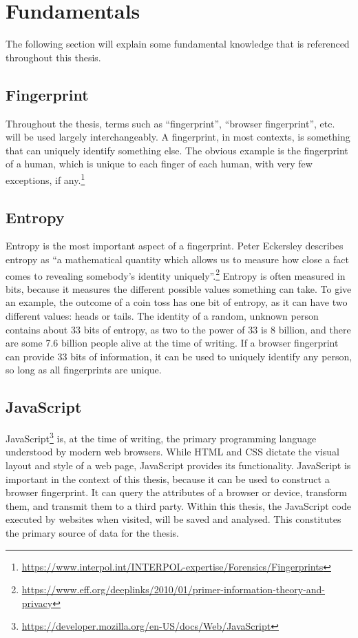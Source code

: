 \documentclass[
    fontsize=12pt,
    headings=small,
    parskip=half,
    bibliography=totoc,
    numbers=noenddot,
    open=any
    ]{scrreprt}
\begin{document}
\section{Fundamentals}
The following section will explain some fundamental knowledge that is
referenced throughout this thesis.

\subsection{Fingerprint}
\label{fundamentals:fingerprint}
Throughout the thesis, terms such as ``fingerprint'', ``browser fingerprint'', etc.
will be used largely interchangeably.
A fingerprint, in most contexts, is something that can uniquely identify something else.
The obvious example is the fingerprint of a human, which is unique to each finger of each human,
with very few exceptions, if any.\footnote{\url{https://www.interpol.int/INTERPOL-expertise/Forensics/Fingerprints}}

\subsection{Entropy}
\label{fundamentals:entropy}
Entropy is the most important aspect of a fingerprint.
Peter Eckersley describes entropy as
``a mathematical quantity which allows us to measure how close a fact comes to revealing somebody's identity uniquely''.\footnote{\url{https://www.eff.org/deeplinks/2010/01/primer-information-theory-and-privacy}}
Entropy is often measured in bits, because it measures the different
possible values something can take.
To give an example, the outcome of a coin toss has one bit of entropy,
as it can have two different values: heads or tails.
The identity of a random, unknown person contains about 33 bits of entropy,
as two to the power of 33 is 8 billion, and there are some 7.6 billion people
alive at the time of writing.
If a browser fingerprint can provide 33 bits of information, it can be used
to uniquely identify any person, so long as all fingerprints are unique.

\subsection{JavaScript}
\label{fundamentals:javascript}
JavaScript\footnote{\url{https://developer.mozilla.org/en-US/docs/Web/JavaScript}} is,
at the time of writing, the primary programming language understood
by modern web browsers. While HTML and CSS dictate the visual layout and style
of a web page, JavaScript provides its functionality.
JavaScript is important in the context of this thesis, because
it can be used to construct a browser fingerprint. It can query
the attributes of a browser or device, transform them, and transmit them
to a third party.
Within this thesis, the JavaScript code executed by websites
when visited, will be saved and analysed.
This constitutes the primary source of data for the thesis.
\end{document}
